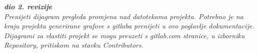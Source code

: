					
		\eject
		
		
		\textbf{\textit{dio 2. revizije}}\\
		
		\textit{Prenijeti dijagram pregleda promjena nad datotekama projekta. Potrebno je na kraju projekta generirane grafove s gitlaba prenijeti u ovo poglavlje dokumentacije. Dijagrami za vlastiti projekt se mogu preuzeti s gitlab.com stranice, u izborniku Repository, pritiskom na stavku Contributors.}
		
	
